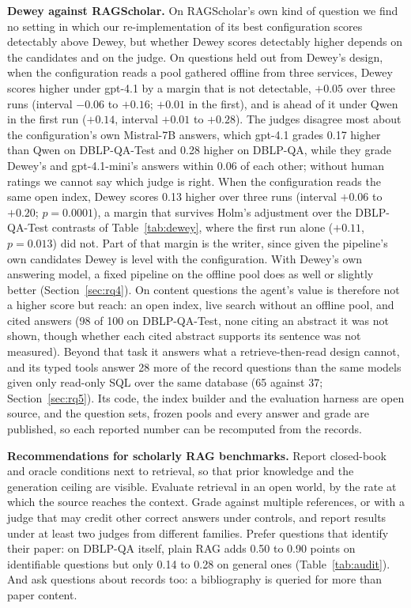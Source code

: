 \documentclass[conference]{IEEEtran}
\newcommand{\dq}{DBLP-QA}
\newcommand{\test}{DBLP-QA-Test}
\begin{document}
\textbf{Dewey against RAGScholar.} On RAGScholar's own kind of question we find no setting in which our
re-implementation of its best configuration scores detectably above Dewey, but whether Dewey scores detectably higher
depends on the candidates and on the judge. On questions held out from Dewey's design, when the
configuration reads a pool gathered offline from three services, Dewey scores higher under gpt-4.1 by a margin
that is not detectable, $+0.05$ over three runs (interval $-0.06$ to $+0.16$; $+0.01$ in the first), and
is ahead of it under Qwen in the first run ($+0.14$, interval $+0.01$ to $+0.28$). The judges disagree
most about the configuration's own Mistral-7B answers, which gpt-4.1 grades 0.17 higher than Qwen on
\test{} and 0.28 higher on \dq{}, while they grade Dewey's and gpt-4.1-mini's answers within 0.06 of each
other; without human ratings we cannot say which judge is right. When the configuration reads the same
open index, Dewey scores 0.13 higher over three runs (interval $+0.06$ to $+0.20$; $p=0.0001$), a margin
that survives Holm's adjustment over the \test{} contrasts of Table~\ref{tab:dewey}, where the first run
alone ($+0.11$, $p=0.013$) did not. Part of that margin is the writer, since given the pipeline's own
candidates Dewey is level with the configuration. With Dewey's own answering model, a fixed pipeline on
the offline pool does as well or slightly better (Section~\ref{sec:rq4}). On content questions the
agent's value is therefore not a higher score but reach: an open index, live search without an offline
pool, and cited answers (98 of 100 on \test{}, none citing an abstract it was not shown, though whether
each cited abstract supports its sentence was not measured). Beyond that task it answers what a
retrieve-then-read design cannot, and its typed tools answer 28 more of the record questions than the
same models given only read-only SQL over the same database (65 against 37; Section~\ref{sec:rq5}). Its code, the index builder and the
evaluation harness are open source, and the question sets, frozen pools and every answer and grade are
published, so each reported number can be recomputed from the records.

\textbf{Recommendations for scholarly RAG benchmarks.} Report closed-book and oracle conditions next to
retrieval, so that prior knowledge and the generation ceiling are visible. Evaluate retrieval in an open
world, by the rate at which the source reaches the context. Grade against multiple references, or with a
judge that may credit other correct answers under controls, and report results under at least two judges
from different families. Prefer questions that identify their paper: on \dq{} itself, plain RAG adds 0.50
to 0.90 points on identifiable questions but only 0.14 to 0.28 on general ones (Table~\ref{tab:audit}).
And ask questions about records too: a bibliography is queried for more than paper content.
\end{document}
